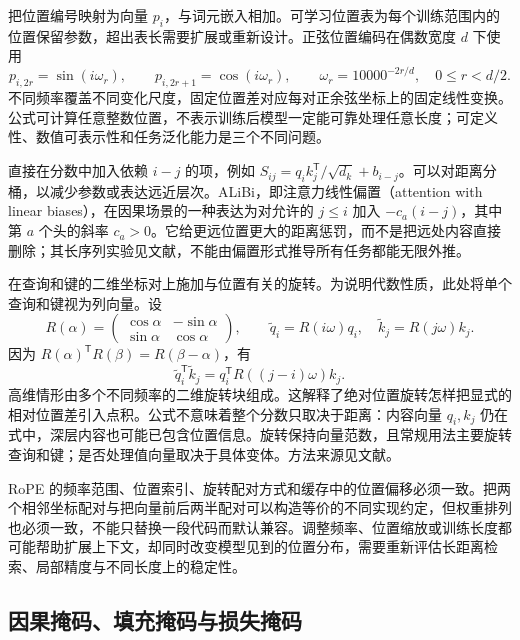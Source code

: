 \documentclass[UTF8,12pt,a4paper,fontset=fandol]{ctexart}
\begin{document}
把位置编号映射为向量 $p_i$，与词元嵌入相加。可学习位置表为每个训练范围内的位置保留参数，超出表长需要扩展或重新设计。正弦位置编码在偶数宽度 $d$ 下使用
\begin{equation}
p_{i,2r}=\sin(i\omega_r),\qquad
p_{i,2r+1}=\cos(i\omega_r),\qquad
\omega_r=10000^{-2r/d},\quad 0\le r<d/2.
\label{eq:tr-sinusoidal}
\end{equation}
不同频率覆盖不同变化尺度，固定位置差对应每对正余弦坐标上的固定线性变换。公式可计算任意整数位置，不表示训练后模型一定能可靠处理任意长度；可定义性、数值可表示性和任务泛化能力是三个不同问题。

直接在分数中加入依赖 $i-j$ 的项，例如 $S_{ij}=q_i k_j^{\mathsf T}/\sqrt{d_k}+b_{i-j}$。可以对距离分桶，以减少参数或表达远近层次。ALiBi，即注意力线性偏置（attention with linear biases），在因果场景的一种表达为对允许的 $j\le i$ 加入 $-c_a(i-j)$，其中第 $a$ 个头的斜率 $c_a>0$。它给更远位置更大的距离惩罚，而不是把远处内容直接删除；其长序列实验见文献\cite{press2021}，不能由偏置形式推导所有任务都能无限外推。

在查询和键的二维坐标对上施加与位置有关的旋转。为说明代数性质，此处将单个查询和键视为列向量。设
\[
R(\alpha)=\begin{pmatrix}\cos\alpha&-\sin\alpha\\\sin\alpha&\cos\alpha\end{pmatrix},
\qquad \widetilde q_i=R(i\omega)q_i,\quad \widetilde k_j=R(j\omega)k_j.
\]
因为 $R(\alpha)^{\mathsf T}R(\beta)=R(\beta-\alpha)$，有
\begin{equation}
\widetilde q_i^{\mathsf T}\widetilde k_j
=q_i^{\mathsf T}R((j-i)\omega)k_j.
\label{eq:tr-rope}
\end{equation}
高维情形由多个不同频率的二维旋转块组成。这解释了绝对位置旋转怎样把显式的相对位置差引入点积。公式不意味着整个分数只取决于距离：内容向量 $q_i,k_j$ 仍在式中，深层内容也可能已包含位置信息。旋转保持向量范数，且常规用法主要旋转查询和键；是否处理值向量取决于具体变体。方法来源见文献\cite{su2021}。

RoPE 的频率范围、位置索引、旋转配对方式和缓存中的位置偏移必须一致。把两个相邻坐标配对与把向量前后两半配对可以构造等价的不同实现约定，但权重排列也必须一致，不能只替换一段代码而默认兼容。调整频率、位置缩放或训练长度都可能帮助扩展上下文，却同时改变模型见到的位置分布，需要重新评估长距离检索、局部精度与不同长度上的稳定性。

\subsection{因果掩码、填充掩码与损失掩码}
\end{document}
